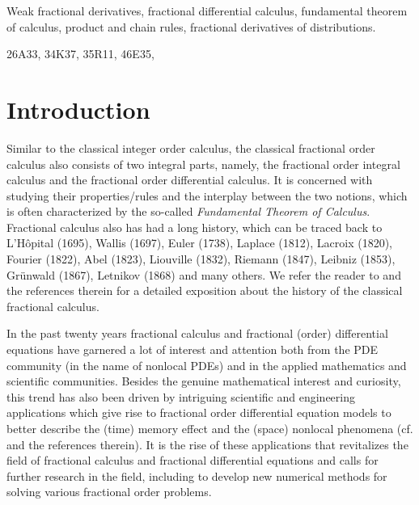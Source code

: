 \documentclass[leqno,final]{siamltex}
\numberwithin{equation}{section}
\renewcommand{\(}{\bigl(}
\renewcommand{\)}{\bigr)}
\begin{document}
\begin{keywords}
    Weak fractional derivatives, fractional differential calculus, fundamental theorem of calculus, product and chain rules, %
    fractional derivatives of distributions.
\end{keywords}

\begin{AMS}
    26A33, %
    34K37, %
    35R11, %
    46E35, %
\end{AMS}


 


 


\section{Introduction}\label{sec-1}

    Similar to the classical integer order calculus, the classical fractional order calculus also consists of two integral parts, namely, the fractional order integral calculus and the fractional order differential calculus. It is concerned with studying their properties/rules and the interplay between the two notions, which is often characterized by the so-called {\em Fundamental Theorem of Calculus}. Fractional calculus also has had a long history, which can be traced back to L'H\^{o}pital (1695), Wallis (1697), Euler (1738), Laplace (1812), Lacroix (1820), Fourier (1822), Abel (1823), Liouville (1832), Riemann (1847), Leibniz (1853), Gr\"unwald (1867), Letnikov (1868) and many others. We refer the reader to \cite{Guo, Podlubny, Samko} and the references therein for a detailed exposition about the history of the classical fractional calculus. 
 
    In the past twenty years fractional calculus and fractional (order) differential equations have garnered a lot of interest and attention both from the PDE community (in the name of nonlocal PDEs) and in the applied mathematics and scientific communities. Besides the genuine mathematical interest and curiosity, this trend has also been driven by intriguing scientific and engineering applications which give rise to fractional order differential equation models to better describe the (time) memory effect and the (space) nonlocal phenomena (cf. \cite{Du2019,Guo,Hilfer,Kilbas, Meerschaert} and the references therein). It is the rise of these applications that revitalizes the field of fractional calculus and fractional differential equations and calls for further research in the field, including to develop new numerical methods for solving various fractional order problems. 
 
\end{document}
